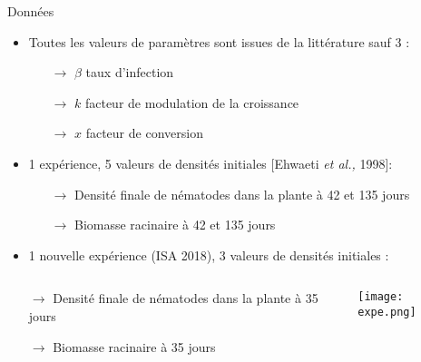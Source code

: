\begin{frame}{Données}

\medskip
\begin{itemize}[itemsep=15pt]
\item Toutes  les  valeurs de paramètres sont issues de la littérature sauf 3 :
	{\small
	\begin{itemize}[label=,leftmargin=2cm]
	\item[$\rightarrow$] $\beta$ taux d'infection
	\item[$\rightarrow$] $k$ facteur de modulation de la croissance
	\item[$\rightarrow$] $x$ facteur de conversion
	\end{itemize}}
	
  
  \pause
\item 1 expérience, 5 valeurs de
densités initiales \textcolor{shadecolor}{\small[Ehwaeti \textit{et al.,} 1998]}:
	{\small
	\begin{itemize}[label=,leftmargin=2cm]
	\item[$\rightarrow$] Densité finale de nématodes dans la plante à 42 et 135 jours
	\item[$\rightarrow$]  Biomasse racinaire à 42 et 135 jours
	\end{itemize}}
	
\item 1 nouvelle expérience (ISA 2018), 3 valeurs de
densités initiales : 
\end{itemize}

 \begin{columns}
 \begin{column}{.52\textwidth} 
	{\small
	\begin{itemize}[label=,leftmargin=2cm]
	\item[$\rightarrow$] Densité finale de nématodes dans la plante à 35 jours
	\item[$\rightarrow$] Biomasse racinaire à 35 jours
	\end{itemize}}
 \end{column}

 \begin{column}{.55\textwidth} 

	\texttt{[image: expe.png]}
 \end{column}
\end{columns}
\end{frame}











